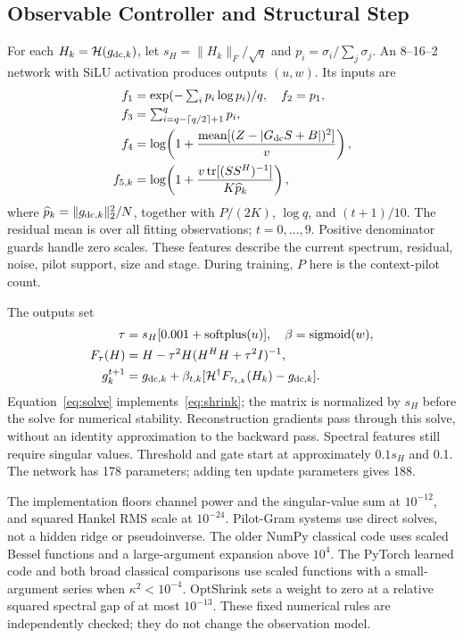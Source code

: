 \documentclass[10pt,journal,letterpaper]{IEEEtran}
\newcommand{\HH}{\mathcal{H}}
\DeclareMathOperator{\tr}{tr}
\DeclareMathOperator{\sigmoid}{sigmoid}
\DeclareMathOperator{\softplus}{softplus}
\begin{document}
\subsection{Observable Controller and Structural Step}
For each $H_k=\HH(g_{{\rm dc},k})$, let $s_H=\|H_k\|_F/\sqrt q$ and $p_i=\sigma_i/\sum_j\sigma_j$. An 8--16--2 network with SiLU activation produces outputs $(u,w)$. Its inputs are
\begin{align}
 f_1&=\exp(-\textstyle\sum_i p_i\log p_i)/q,\quad f_2=p_1,\nonumber\\
 f_3&=\textstyle\sum_{i=q-\lceil q/2\rceil+1}^q p_i,\label{eq:features}\\
 f_4&=\log\!\left(1+\frac{\operatorname{mean}[(Z-|G_{\rm dc}S+B|)^2]}{v}\right),\nonumber\\
 f_{5,k}&=\log\!\left(1+\frac{v\tr[(SS^H)^{-1}]}{K\widehat p_k}\right),\nonumber
\end{align}
where $\widehat p_k=\|g_{{\rm dc},k}\|_2^2/N$, together with $P/(2K)$, $\log q$, and $(t+1)/10$. The residual mean is over all fitting observations; $t=0,\ldots,9$. Positive denominator guards handle zero scales. These features describe the current spectrum, residual, noise, pilot support, size and stage. During training, $P$ here is the context-pilot count.

The outputs set
\begin{align}
 \tau&=s_H[0.001+\softplus(u)],\quad \beta=\sigmoid(w),\\
 F_\tau(H)&=H-\tau^2H(H^HH+\tau^2I)^{-1},\label{eq:solve}\\
 g_k^{t+1}&=g_{{\rm dc},k}+\beta_{t,k}
       [\HH^\dagger F_{\tau_{t,k}}(H_k)-g_{{\rm dc},k}].
\end{align}
Equation~\eqref{eq:solve} implements~\eqref{eq:shrink}; the matrix is normalized by $s_H$ before the solve for numerical stability. Reconstruction gradients pass through this solve, without an identity approximation to the backward pass. Spectral features still require singular values. Threshold and gate start at approximately $0.1s_H$ and 0.1. The network has 178 parameters; adding ten update parameters gives 188.

The implementation floors channel power and the singular-value sum at $10^{-12}$, and squared Hankel RMS scale at $10^{-24}$. Pilot-Gram systems use direct solves, not a hidden ridge or pseudoinverse. The older NumPy classical code uses scaled Bessel functions and a large-argument expansion above $10^4$. The PyTorch learned code and both broad classical comparisons use scaled functions with a small-argument series when $\kappa^2<10^{-4}$. OptShrink sets a weight to zero at a relative squared spectral gap of at most $10^{-13}$. These fixed numerical rules are independently checked; they do not change the observation model.
\end{document}
